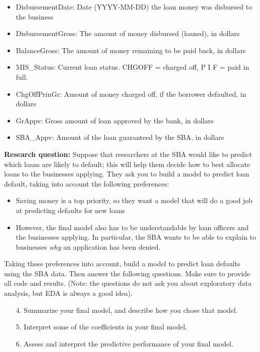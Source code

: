 \documentclass[11pt]{article}
\begin{document}
\begin{itemize}
\item DisbursementDate: 	Date (YYYY-MM-DD) the loan money was disbursed to the business
\item DisbursementGross:	The amount of money disbursed (loaned), in dollars
\item BalanceGross: 	The amount of money remaining to be paid back, in dollars
\item MIS\_Status: 	Current loan status. CHGOFF = charged off, P I F = paid in full.
\item ChgOffPrinGr: 	Amount of money charged off, if the borrower defaulted, in dollars
\item GrAppv: 	Gross amount of loan approved by the bank, in dollars
\item SBA\_Appv: 	Amount of the loan guaranteed by the SBA, in dollars 
\end{itemize}

\noindent \textbf{Research question:} Suppose that researchers at the SBA would like to predict which loans are likely to default; this will help them decide how to best allocate loans to the businesses applying. They ask you to build a model to predict loan default, taking into account the following preferences:
\begin{itemize}
\item Saving money is a top priority, so they want a model that will do a good job at predicting defaults for new loans

\item However, the final model also has to be understandable by loan officers and the businesses applying. In particular, the SBA wants to be able to explain to businesses \textit{why} an application has been denied.
\end{itemize}

\noindent Taking these preferences into account, build a model to predict loan defaults using the SBA data. Then answer the following questions. Make sure to provide all code and results. (Note: the questions do not ask you about exploratory data analysis, but EDA is always a good idea).

\begin{enumerate}
\item[4.] Summarize your final model, and describe how you chose that model. 

\item[5.] Interpret some of the coefficients in your final model.

\item[6.] Assess and interpret the predictive performance of your final model.
\end{enumerate}
\end{document}
